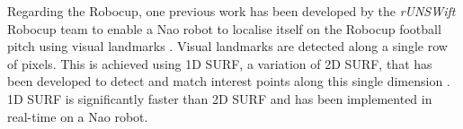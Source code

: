 Regarding the Robocup, one previous work has been developed by the \textit{rUNSWift} Robocup team to enable a Nao robot to localise itself on the Robocup football pitch using visual landmarks \citep{Anderson}. Visual landmarks are detected along a single row of pixels. This is achieved using 1D SURF, a variation of 2D SURF, that has been developed to detect and match interest points along this single dimension \citep{Anderson}. 1D SURF is significantly faster than 2D SURF and has been implemented in real-time on a Nao robot.\\













